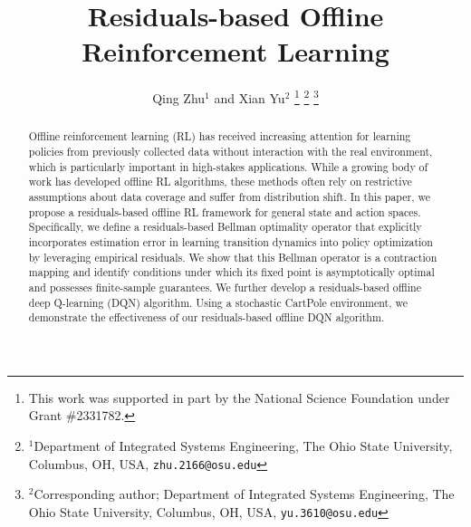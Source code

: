 \documentclass[letterpaper, 10 pt, conference]{ieeeconf}  %
\title{\LARGE \bf
Residuals-based Offline Reinforcement Learning
}
\author{Qing Zhu$^{1}$ and Xian Yu$^{2}$%
\thanks{This work was supported in part by the National Science Foundation under Grant \#2331782.}%
\thanks{$^{1}$Department of Integrated Systems Engineering, The Ohio State University, Columbus, OH, USA,
        {\tt\small zhu.2166@osu.edu}}%
\thanks{$^{2}$Corresponding author; Department of Integrated Systems Engineering, The Ohio State University, Columbus, OH, USA,
        {\tt\small yu.3610@osu.edu}}%
}
\begin{document}
\maketitle
\thispagestyle{empty}
\pagestyle{empty}


\begin{abstract}
Offline reinforcement learning (RL) has received increasing attention for learning policies from previously collected data without interaction with the real environment, which is particularly important in high-stakes applications. 
While a growing body of work has developed offline RL algorithms, these methods often rely on restrictive assumptions about data coverage and suffer from distribution shift.
In this paper, we propose a residuals-based offline RL framework for general state and action spaces. Specifically, we define a residuals-based Bellman optimality operator that explicitly incorporates estimation error in learning transition dynamics into policy optimization by leveraging empirical residuals. We show that this Bellman operator is a contraction mapping and identify conditions under which its fixed point is asymptotically optimal and possesses finite-sample guarantees. We further develop a residuals-based offline deep Q-learning (DQN) algorithm. Using a stochastic CartPole environment, we demonstrate the effectiveness of our residuals-based offline DQN algorithm.

\end{abstract}


\end{document}

